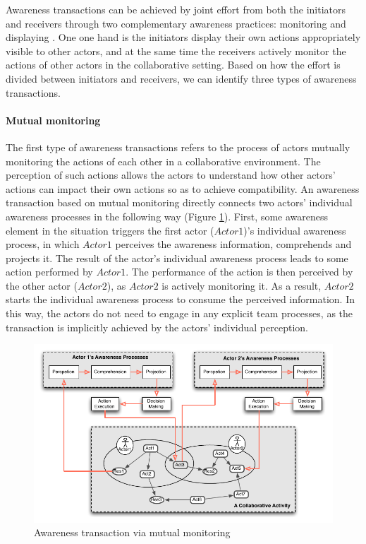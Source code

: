 Awareness transactions can be achieved by joint effort from both the initiators and receivers through two complementary awareness practices: monitoring and displaying \cite{heath2002a}. One one hand is the initiators display their own actions appropriately visible to other actors, and at the same time the receivers actively monitor the actions of other actors in the collaborative setting. Based on how the effort is divided between initiators and receivers, we can identify three types of awareness transactions.

\paragraph*{Mutual monitoring} %
\label{par:monitoring}
The first type of awareness transactions refers to the process of actors mutually monitoring the actions of each other in a collaborative environment. The perception of such actions allows the actors to understand how other actors' actions can impact their own actions so as to achieve compatibility. An awareness transaction based on mutual monitoring directly connects two actors' individual awareness processes in the following way (Figure \ref{fig:trans_monitoring}). First, some awareness element in the situation triggers the first actor ($Actor1$)'s individual awareness process, in which $Actor1$ perceives the awareness information, comprehends and projects it. The result of the actor's individual awareness process leads to some action performed by $Actor1$. The performance of the action is then perceived by the other actor ($Actor2$), as $Actor2$ is actively monitoring it. As a result, $Actor2$ starts the individual awareness process to consume the perceived information. In this way, the actors do not need to engage in any explicit team processes, as the transaction is implicitly achieved by the actors' individual perception.

\begin{figure}[htbp] %
   \centering
   \includegraphics{trans_monitoring.pdf} 
   \caption{Awareness transaction via mutual monitoring}
   \label{fig:trans_monitoring}
\end{figure}

